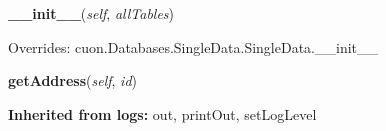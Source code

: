     \begin{boxedminipage}{\textwidth}

    \raggedright \textbf{\_\_init\_\_}(\textit{self}, \textit{allTables})

      Overrides: cuon.Databases.SingleData.SingleData.\_\_init\_\_

    \end{boxedminipage}

    \label{cuon:Skeleton:SingleClient:SingleClient:getAddress}
    \vspace{0.5ex}

    \begin{boxedminipage}{\textwidth}

    \raggedright \textbf{getAddress}(\textit{self}, \textit{id})

    \end{boxedminipage}

  \textbf{Inherited from logs:}
    out,
    printOut,
    setLogLevel
